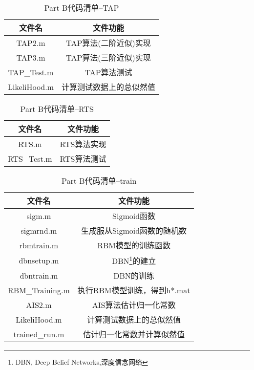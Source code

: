 \documentclass[11pt]{article}
\begin{document}
\begin{table}[!htbp]
  \centering  
  \begin{tabular}{c|c} 
  \hline\hline
  文件名 & 文件功能\\ \hline
  TAP2.m & TAP算法(二阶近似)实现\\
  TAP3.m & TAP算法(三阶近似)实现\\
  TAP\_Test.m & TAP算法测试 \\
  LikeliHood.m & 计算测试数据上的总似然值 \\
  \hline\hline
\end{tabular}
\caption{Part B代码清单--TAP}
\label{CodeList2-TAP}
\end{table}

\begin{table}[!htbp]
  \centering  
  \begin{tabular}{c|c} 
  \hline\hline
  文件名 & 文件功能\\ \hline
  RTS.m & RTS算法实现\\
  RTS\_Test.m & RTS算法测试 \\
  \hline\hline
\end{tabular}
\caption{Part B代码清单--RTS}
\label{CodeList2-RTS}
\end{table}


\begin{table}[!htbp]
  \centering  
  \begin{tabular}{c|c} 
  \hline\hline
  文件名 & 文件功能\\ \hline
  sigm.m & Sigmoid函数 \\
  sigmrnd.m & 生成服从Sigmoid函数的随机数 \\
  rbmtrain.m & RBM模型的训练函数\\
  dbnsetup.m & DBN\footnote{DBN, Deep Belief Networks,深度信念网络}的建立\\
  dbntrain.m & DBN的训练\\
  RBM\_Training.m & 执行RBM模型训练，得到h*.mat\\ \hline
  AIS2.m & AIS算法估计归一化常数 \\ 
  LikeliHood.m & 计算测试数据上的总似然值 \\
  trained\_run.m & 估计归一化常数并计算似然值 \\
  \hline\hline
\end{tabular}
\caption{Part B代码清单--train}
\label{CodeList2-train}
\end{table}
\end{document}
